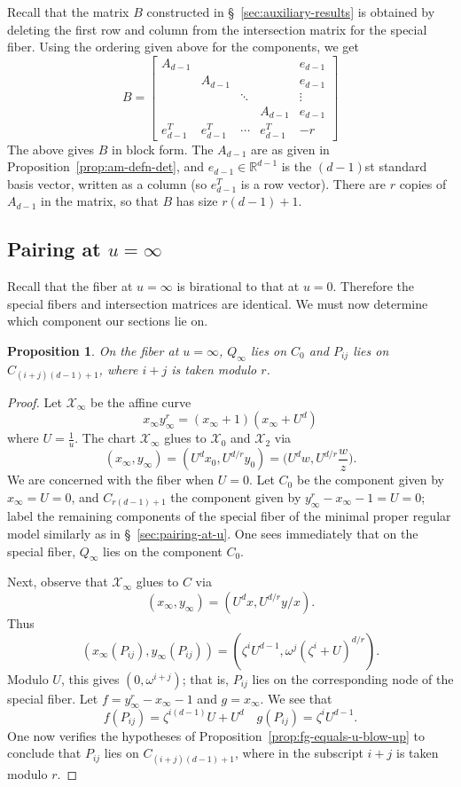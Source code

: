 \documentclass[pagesize,paper=letter]{scrartcl}
\newtheorem{proposition}[thm]{Proposition}
\theoremstyle{definition}
\theoremstyle{remark}
\def\R{\mathbb{R}}
\def\sX{\mathcal{X}}
\newcommand{\sxi}{\mathcal{X}_\infty}
\begin{document}
Recall that the matrix $B$ constructed in \S~\ref{sec:auxiliary-results} is obtained by deleting the first row and column from the intersection matrix for the special fiber. Using the ordering given above for the components, we get
\[
B =
\left[\begin{array}{ccccc}
  A_{d-1} & & & & e_{d-1} \\
  & A_{d-1} & & & e_{d-1} \\
  & & \ddots & & \vdots \\
  & & & A_{d-1} & e_{d-1} \\
  e_{d-1}^T & e_{d-1}^T & \cdots & e_{d-1}^T & -r
\end{array}\right]
\]
The above gives $B$ in block form. The $A_{d-1}$ are as given in Proposition~\ref{prop:am-defn-det}, and $e_{d-1} \in \R^{d-1}$ is the $(d-1)$st standard basis vector, written as a column (so $e_{d-1}^T$ is a row vector). There are $r$ copies of $A_{d-1}$ in the matrix, so that $B$ has size $r(d-1) + 1$.

\subsection{Pairing at $u=\infty$}
\label{sec:pairing-at-u=infty}

Recall that the fiber at $u=\infty$ is birational to that at $u=0$. Therefore the special fibers and intersection matrices are identical. We must now determine which component our sections lie on.
\begin{proposition}
  On the fiber at $u=\infty$, $Q_\infty$ lies on $C_0$ and $P_{ij}$ lies on $C_{(i+j)(d-1) +1}$, where $i+j$ is taken modulo $r$.
\end{proposition}

\begin{proof}
  Let $\sxi$ be the affine curve
  \[
  x_\infty y_\infty^r = (x_\infty + 1)(x_\infty + {U^d})
  \]
  where $U = \frac{1}{u}$. The chart $\sxi$ glues to $\sX_0$ and $\sX_2$ via 
  \[
  (x_\infty, y_\infty) = (U^d x_0, U^{d/r} y_0) = \bigg(U^d w, U^{d/r} \frac{w}{z}\bigg).
  \]
  We are concerned with the fiber when $U = 0$. Let $C_0$ be the component given by $x_\infty = U = 0$, and $C_{r(d-1)+1}$ the component given by $y_\infty^r - x_\infty - 1 = U = 0$; label the remaining components of the special fiber of the minimal proper regular model similarly as in \S~\ref{sec:pairing-at-u}. One sees immediately that on the special fiber, $Q_\infty$ lies on the component $C_0$.

  Next, observe that $\sxi$ glues to $C$ via
  \[
  (x_\infty, y_\infty) = (U^d x, U^{d/r} y/x).
  \]
  Thus
  \[
  (x_\infty(P_{ij}), y_\infty(P_{ij})) = (\zeta^i U^{d-1}, \omega^j (\zeta^i + U)^{d/r}).
  \]
  Modulo $U$, this gives $(0,\omega^{i+j})$; that is, $P_{ij}$ lies on the corresponding node of the special fiber. Let $f = y_\infty^r - x_\infty - 1$ and $g = x_\infty$. We see that 
  \[
  f(P_{ij}) = \zeta^{i(d-1)} U + U^d \quad g(P_{ij}) = \zeta^i U^{d-1}.
  \]
  One now verifies the hypotheses of Proposition~\ref{prop:fg-equals-u-blow-up} to conclude that $P_{ij}$ lies on $C_{(i+j)(d-1) +1}$, where in the subscript $i+j$ is taken modulo $r$.
\end{proof}
\end{document}
